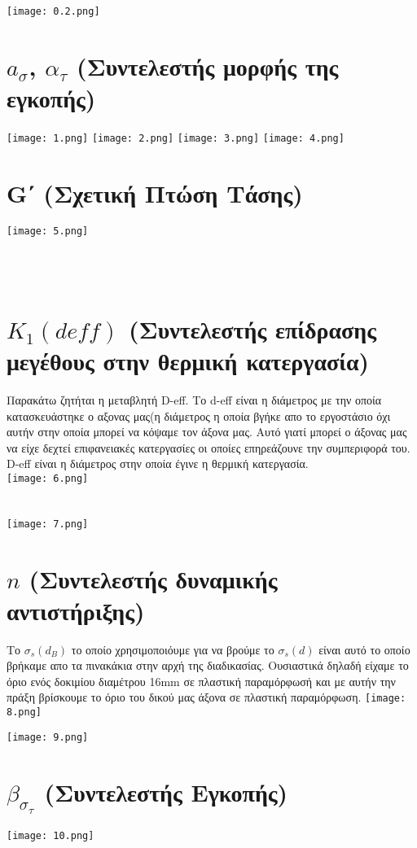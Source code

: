 \documentclass{article}
\begin{document}
\texttt{[image: 0.2.png]}

\section{\textbf{\huge $a_σ$, $α_τ$  }    (Συντελεστής μορφής της εγκοπής) } 
\texttt{[image: 1.png]}
\texttt{[image: 2.png]}
\texttt{[image: 3.png]}
\texttt{[image: 4.png]}
\section{\textbf{\huge G΄}  (Σχετική Πτώση Τάσης) }
\texttt{[image: 5.png]}


\\
\\



\section{\textbf{\huge $K_1(deff)$ }   (Συντελεστής επίδρασης μεγέθους στην θερμική κατεργασία) }
Παρακάτω ζητήται η μεταβλητή D-eff. Το d-eff είναι η διάμετρος με την οποία κατασκευάστηκε ο αξονας μας(η διάμετρος η οποία βγήκε απο το εργοστάσιο όχι αυτήν στην οποία μπορεί να κόψαμε τον άξονα μας. Αυτό γιατί μπορεί ο άξονας μας να είχε δεχτεί επιφανειακές κατεργασίες οι οποίες επηρεάζουνε την συμπεριφορά του. D-eff είναι η διάμετρος στην οποία έγινε η θερμική κατεργασία.
\\


\texttt{[image: 6.png]}
\\
\\
\\

\texttt{[image: 7.png]}
\section{\textbf{\huge $n$}  (Συντελεστής δυναμικής αντιστήριξης)} 
Το $σ_s(d_B)$ το οποίο χρησιμοποιόυμε για να βρούμε το $σ_s(d)$ είναι αυτό το οποίο βρήκαμε απο τα πινακάκια στην αρχή της διαδικασίας. Ουσιαστικά δηλαδή είχαμε το όριο ενός δοκιμίου διαμέτρου 16mm σε πλαστική παραμόρφωσή και με αυτήν την πράξη βρίσκουμε το όριο του δικού μας άξονα σε πλαστική παραμόρφωση.
\texttt{[image: 8.png]}

\texttt{[image: 9.png]}
\section{\textbf{\huge $β_σ_τ$}   (Συντελεστής Εγκοπής)}
\texttt{[image: 10.png]}
\end{document}
